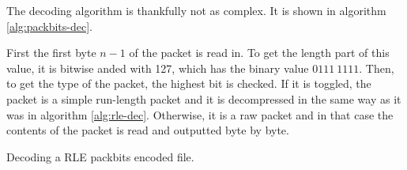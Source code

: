 The decoding algorithm is thankfully not as complex. It is shown in
algorithm \ref{alg:packbits-dec}.

First the first byte $n-1$ of the packet is read in. To get the length
part of this value, it is bitwise anded with 127, which has the binary
value $0111\ 1111$.  Then, to get the type of the packet, the highest
bit is checked. If it is toggled, the packet is a simple run-length
packet and it is decompressed in the same way as it was in algorithm
\ref{alg:rle-dec}. Otherwise, it is a raw packet and in that case the
contents of the packet is read and outputted byte by byte.

\begin{algorithm}
  \caption{Decoding a RLE packbits encoded file.}
  \label{alg:packbits-dec}
  \begin{algorithmic}[1]


    \While{\neof}



        \State {}
        \EndRepeatn
      \Else

        \State {}
        \EndRepeatn

      \EndIf


    \EndWhile
  \end{algorithmic}
\end{algorithm}

\FloatBarrier

\answers{}

